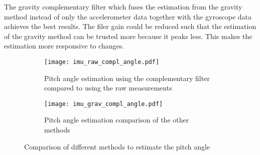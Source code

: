 The gravity complementary filter which fuses the estimation from the gravity method instead of only the accelerometer data together with the gyroscope data achieves the best results.
The filer gain could be reduced such that the estimation of the gravity method can be trusted more because it peaks less.
This makes the estimation more responsive to changes.
\begin{figure}[htb]
    \centering
    \begin{subfigure}{1\textwidth}
        \centering
        \texttt{[image: imu\_raw\_compl\_angle.pdf]}
        \caption{Pitch angle estimation using the complementary filter compared to using the raw measurements}
        \label{fig:imu_raw_compl_angle}
    \end{subfigure}
    
    \begin{subfigure}{1\textwidth}
        \centering
        \texttt{[image: imu\_grav\_compl\_angle.pdf]}
        \caption{Pitch angle estimation comparison of the other methods}
        \label{fig:imu_grav_compl_angle}
    \end{subfigure}
    \caption{Comparison of different methods to estimate the pitch angle}
\end{figure}
